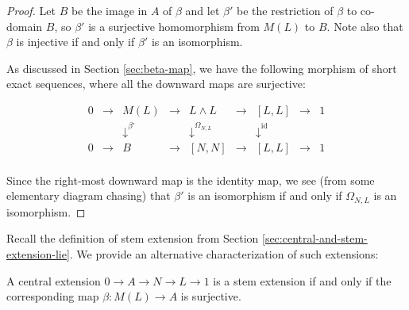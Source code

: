 \documentclass{ucetd}
\begin{document}
\begin{proof}
  Let $B$ be the image in $A$ of $\beta$ and let $\beta'$ be the
  restriction of $\beta$ to co-domain $B$, so $\beta'$ is a surjective
  homomorphism from $M(L)$ to $B$. Note also that $\beta$ is injective
  if and only if $\beta'$ is an isomorphism.

  As discussed in Section \ref{sec:beta-map}, we have the following
  morphism of short exact sequences, where all the downward maps are
  surjective:

  $$\begin{array}{ccccccccc}
    0 & \to & M(L) & \to & L \wedge L & \to & [L,L] & \to & 1\\
    &&   \downarrow^{\beta'}  &&  \downarrow^{\Omega_{N,L}}     && \downarrow^{\text{id}} && \\
    0 & \to & B &\to & [N,N] & \to & [L,L] & \to & 1\\
  \end{array}$$
  
  Since the right-most downward map is the identity map, we see (from
  some elementary diagram chasing) that $\beta'$ is an isomorphism if
  and only if $\Omega_{N,L}$ is an isomorphism. 
\end{proof}

Recall the definition of stem extension from Section
\ref{sec:central-and-stem-extension-lie}. We provide an alternative
characterization of such extensions:

\begin{lemma}\label{lemma:stem-beta-surjective-lie}
  A central extension $0 \to A \to N \to L \to 1$ is a stem extension
  if and only if the corresponding map $\beta: M(L) \to A$ is
  surjective.
\end{lemma}
\end{document}

